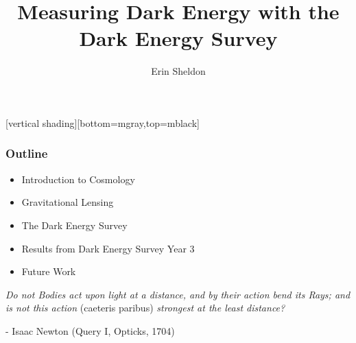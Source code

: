 \documentclass{beamer}
\title{Measuring Dark Energy with the\\Dark Energy Survey}
\author{Erin Sheldon}
\institute{Brookhaven National Laboratory}
\begin{document}
\frame{\titlepage}

\frame
{
}


[vertical shading][bottom=mgray,top=mblack]

\frame
{
    \frametitle{Outline}

 
    \begin{itemize}

        \item Introduction to Cosmology

        \item Gravitational Lensing

        \item The Dark Energy Survey

        \item Results from Dark Energy Survey Year 3

        \item Future Work

    \end{itemize}

}

\frame
{

    {\Large 
        {\em Do not Bodies act upon light at a distance, and by their action bend its Rays;
        and is not this action } (caeteris paribus) {\em strongest at the least distance?}
        \newline

        \hfill - Isaac Newton (Query I, Opticks, 1704)
    }
}
\end{document}

